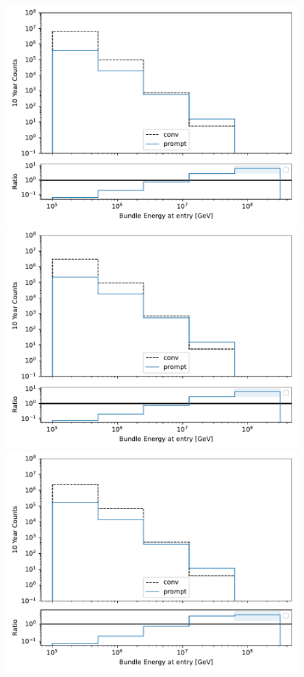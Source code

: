 \documentclass[aspectratio=1610, 9pt]{beamer}
\begin{document}
\begin{frame}
\begin{minipage}[t]{0.24\textwidth}
  \end{minipage}
  \begin{minipage}[t]{0.24\textwidth}
    \includegraphics[width=0.85\textwidth]{../Plots/bundle_spectrum_reco.pdf}
    \includegraphics[width=0.85\textwidth]{../Plots/bundle_spectrum_reco_5e5_surface.pdf}
    \includegraphics[width=0.85\textwidth]{../Plots/bundle_spectrum_reco_5e5surface_quality.pdf}

\end{minipage}
\end{frame}
\end{document}
